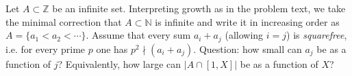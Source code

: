 Let $A\subset\mathbb Z$ be an infinite set.
Interpreting growth as in the problem text, we take the minimal correction that $A\subset\mathbb N$ is infinite and write it in increasing order as $A=\{a_1<a_2<\cdots\}$.
Assume that every sum $a_i+a_j$ (allowing $i=j$) is \emph{squarefree}, i.e. for every prime $p$ one has $p^2\nmid (a_i+a_j)$.
Question: how small can $a_j$ be as a function of $j$? Equivalently, how large can $|A\cap[1,X]|$ be as a function of $X$?
